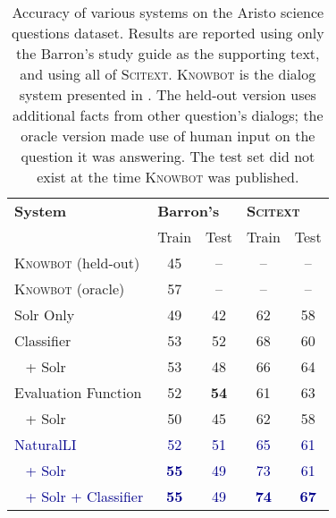 %
%
\def\t#1{\small{#1}}
\def\b#1{\t{\textbf{#1}}}
\def\m#1{\t{\textcolor{darkblue}{#1}}}
\def\c#1{\b{\textcolor{darkblue}{#1}}}
\def\colspaceS{2.0mm}
\def\colspaceM{3.0mm}
\def\colspaceL{5.0mm}

\begin{table}
\begin{center}
\begin{tabular}{l@{\hskip \colspaceL}c@{\hskip \colspaceS}c@{\hskip \colspaceL}c@{\hskip \colspaceS}c}
\toprule
\textbf{System} & \multicolumn{2}{l}{\textbf{Barron's}} & \multicolumn{2}{l}{\textbf{\textsc{Scitext}}} \\
 & Train & Test & Train & Test \\     %
\toprule                          %
\t{\textsc{Knowbot} (held-out)} & \t{45}  & \t{--}   & \t{--}  & \t{--} \\
\t{\textsc{Knowbot} (oracle)}   & \t{57}  & \t{--}   & \t{--}  & \t{--} \\
\midrule                                                           
\t{Solr Only}                   & \t{49}  & \t{42}   & \t{62}  & \t{58} \\
\t{Classifier}                  & \t{53}  & \t{52}   & \t{68}  & \t{60} \\
\t{$~~$ + Solr}                 & \t{53}  & \t{48}   & \t{66}  & \t{64} \\
\midrule                                                           
\t{Evaluation Function}         & \t{52}  & \b{54}   & \t{61}  & \t{63} \\
\t{$~~$ + Solr}                 & \t{50}  & \t{45}   & \t{62}  & \t{58} \\
\m{NaturalLI}                   & \m{52}  & \m{51}   & \m{65}  & \m{61} \\
\m{$~~$ + Solr}                 & \c{55}  & \m{49}   & \m{73}  & \m{61} \\
\m{$~~$ + Solr + Classifier}    & \c{55}  & \m{49}   & \c{74}  & \c{67} \\
\bottomrule
\end{tabular}
\end{center}
\caption{
\label{tab:aristonaturalli}
Accuracy of various systems on the Aristo science questions dataset.
Results are reported using only the Barron's study guide as the supporting
  text, and using all of \textsc{Scitext}.
\textsc{Knowbot} is the dialog system presented in .
The held-out version uses additional facts from other question's dialogs;
  the oracle version made use of human input on the question it was 
  answering.
The test set did not exist at the time \textsc{Knowbot} was published.
}
\end{table}


